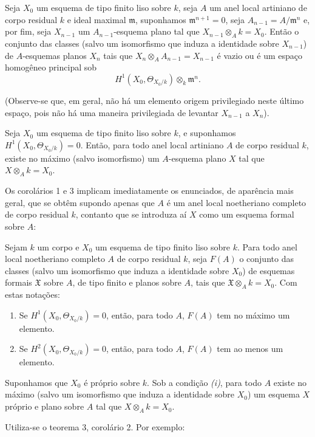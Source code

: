  Seja $X_0$ um esquema de tipo finito liso sobre $k$, seja
$A$ um anel local artiniano de corpo residual $k$ e ideal maximal
$\mathfrak m$, suponhamos $\mathfrak m^{n+1}=0$, seja
$A_{n-1}=A/\mathfrak m^n$ e, por fim, seja $X_{n-1}$ um
$A_{n-1}$-esquema plano tal que $X_{n-1}\otimes_A k=X_0$. Então o conjunto
das classes (salvo um isomorfismo que induza a identidade sobre $X_{n-1}$)
de $A$-esquemas planos $X_n$ tais que
$X_n\otimes_A A_{n-1}=X_{n-1}$ é vazio ou é um espaço homogêneo principal
sob
\[
  H^1(X_0,\Theta_{X_0/k})\otimes_k\mathfrak m^n.
\]

(Observe-se que, em geral, não há um elemento origem privilegiado neste
último espaço, pois não há uma maneira privilegiada de levantar $X_{n-1}$ a
$X_n$).

 Seja $X_0$ um esquema de tipo finito liso sobre $k$, e
suponhamos $H^1(X_0,\Theta_{X_0/k})=0$. Então, para todo anel local
artiniano $A$ de corpo residual $k$, existe no máximo (salvo isomorfismo) um
$A$-esquema plano $X$ tal que $X\otimes_A k=X_0$.

Os corolários 1 e 3 implicam imediatamente os enunciados, de aparência mais
geral, que se obtêm supondo apenas que $A$ é um anel local
noetheriano completo de corpo residual $k$, contanto que se introduza aí $X$
como um esquema formal sobre $A$:

 Sejam $k$ um corpo e $X_0$ um esquema de tipo finito liso
sobre $k$. Para todo anel local noetheriano completo $A$ de corpo residual
$k$, seja $F(A)$ o conjunto das classes (salvo um isomorfismo que induza a
identidade sobre $X_0$) de esquemas formais $\mathfrak X$ sobre $A$, de tipo
finito e planos sobre $A$, tais que $\mathfrak X\otimes_A k=X_0$. Com estas
notações:
\begin{enumerate}
  \item[\textit{i.}] Se $H^1(X_0,\Theta_{X_0/k})=0$, então, para todo $A$,
    $F(A)$ tem no máximo um elemento.
  \item[\textit{ii.}] Se $H^2(X_0,\Theta_{X_0/k})=0$, então, para todo $A$,
    $F(A)$ tem ao menos um elemento.
\end{enumerate}

 Suponhamos que $X_0$ é próprio sobre $k$. Sob a
condição \textit{(i)}, para todo $A$ existe no máximo (salvo um isomorfismo que
induza a identidade sobre $X_0$) um esquema $X$ próprio e plano sobre $A$ tal
que $X\otimes_A k=X_0$.

Utiliza-se o teorema 3, corolário 2. Por exemplo:

